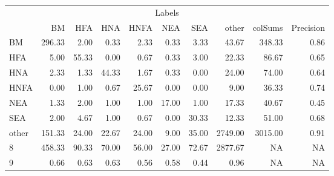 \begin{table}
\centering\begingroup\fontsize{11}{13}\selectfont

\begin{tabular}{lrrrrrr>{}r|rr}
\toprule
\multicolumn{10}{c}{Labels} \\
\cmidrule(l{3pt}r{3pt}){1-10}
  & BM & HFA & HNA & HNFA & NEA & SEA & other & colSums & Precision\\
\midrule
BM & 296.33 & 2.00 & 0.33 & 2.33 & 0.33 & 3.33 & 43.67 & 348.33 & 0.86\\
HFA & 5.00 & 55.33 & 0.00 & 0.67 & 0.33 & 3.00 & 22.33 & 86.67 & 0.65\\
HNA & 2.33 & 1.33 & 44.33 & 1.67 & 0.33 & 0.00 & 24.00 & 74.00 & 0.64\\
HNFA & 0.00 & 1.00 & 0.67 & 25.67 & 0.00 & 0.00 & 9.00 & 36.33 & 0.74\\
NEA & 1.33 & 2.00 & 1.00 & 1.00 & 17.00 & 1.00 & 17.33 & 40.67 & 0.45\\
\addlinespace
SEA & 2.00 & 4.67 & 1.00 & 0.67 & 0.00 & 30.33 & 12.33 & 51.00 & 0.68\\
other & 151.33 & 24.00 & 22.67 & 24.00 & 9.00 & 35.00 & 2749.00 & 3015.00 & 0.91\\
8 & 458.33 & 90.33 & 70.00 & 56.00 & 27.00 & 72.67 & 2877.67 & NA & NA\\
9 & 0.66 & 0.63 & 0.63 & 0.56 & 0.58 & 0.44 & 0.96 & NA & NA\\
\bottomrule
\end{tabular}
\endgroup{}
\end{table}

